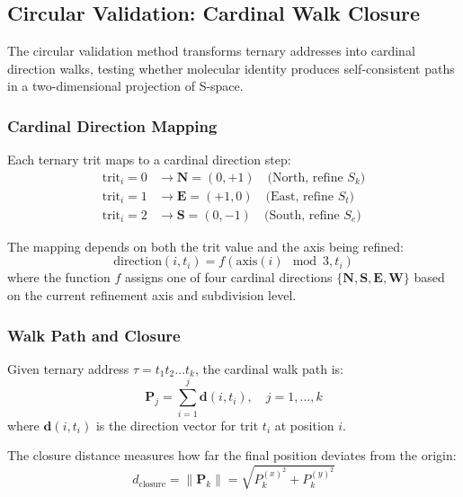 \documentclass[twocolumn,10pt]{article}
\begin{document}
\subsection{Circular Validation: Cardinal Walk Closure}

The circular validation method transforms ternary addresses into cardinal direction walks, testing whether molecular identity produces self-consistent paths in a two-dimensional projection of S-space.

\subsubsection{Cardinal Direction Mapping}

Each ternary trit maps to a cardinal direction step:
\begin{align}
\text{trit}_i = 0 &\to \mathbf{N} = (0, +1) \quad \text{(North, refine } S_k\text{)} \\
\text{trit}_i = 1 &\to \mathbf{E} = (+1, 0) \quad \text{(East, refine } S_t\text{)} \\
\text{trit}_i = 2 &\to \mathbf{S} = (0, -1) \quad \text{(South, refine } S_e\text{)}
\end{align}

The mapping depends on both the trit value and the axis being refined:
\begin{equation}
\text{direction}(i, t_i) = f(\text{axis}(i) \mod 3, t_i)
\end{equation}
where the function $f$ assigns one of four cardinal directions $\{\mathbf{N}, \mathbf{S}, \mathbf{E}, \mathbf{W}\}$ based on the current refinement axis and subdivision level.

\subsubsection{Walk Path and Closure}

Given ternary address $\tau = t_1 t_2 \ldots t_k$, the cardinal walk path is:
\begin{equation}
\mathbf{P}_j = \sum_{i=1}^{j} \mathbf{d}(i, t_i), \quad j = 1, \ldots, k
\end{equation}
where $\mathbf{d}(i, t_i)$ is the direction vector for trit $t_i$ at position $i$.

The closure distance measures how far the final position deviates from the origin:
\begin{equation}
d_{\text{closure}} = \|\mathbf{P}_k\| = \sqrt{P_k^{(x)^2} + P_k^{(y)^2}}
\end{equation}
\end{document}
